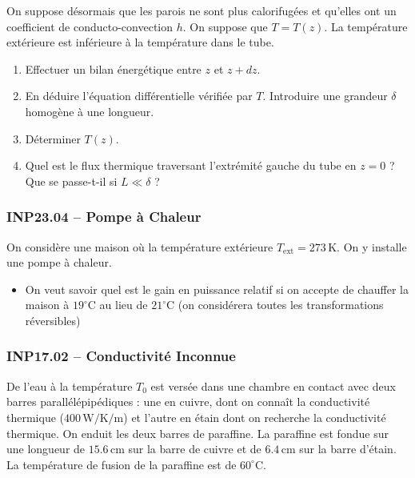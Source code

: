 On suppose désormais que les parois ne sont plus calorifugées et qu'elles ont un coefficient de conducto-convection $h$. On suppose que $T = T(z)$. La température extérieure est inférieure à la température dans le tube.

\begin{enumerate}[resume]
\item Effectuer un bilan énergétique entre $z$ et $z + dz$.
\item En déduire l'équation différentielle vérifiée par $T$. Introduire une grandeur $\delta$ homogène à une longueur.
\item Déterminer $T(z)$.
\item Quel est le flux thermique traversant l'extrémité gauche du tube en $z = 0$ ? Que se passe-t-il si $L \ll \delta$ ?
\end{enumerate}

\newpage
\subsubsection*{INP23.04 -- Pompe à Chaleur }

On considère une maison où la température extérieure $T_{\text{ext}} = 273\,\text{K}$. On y installe une pompe à chaleur.

\begin{itemize}[label=\textbullet]
\item On veut savoir quel est le gain en puissance relatif si on accepte de chauffer la maison à $19^\circ\text{C}$ au lieu de $21^\circ\text{C}$ (on considérera toutes les transformations réversibles)
\end{itemize}


\subsubsection*{INP17.02 -- Conductivité Inconnue  \corrige}

\begin{center}
\end{center}

De l'eau à la température $T_{0}$ est versée dans une chambre en contact avec deux barres parallélépipédiques : une en cuivre, dont on connaît la conductivité thermique ($400\,\text{W/K/m}$) et l'autre en étain dont on recherche la conductivité thermique. On enduit les deux barres de paraffine. La paraffine est fondue sur une longueur de $15.6\,\text{cm}$ sur la barre de cuivre et de $6.4\,\text{cm}$ sur la barre d'étain. La température de fusion de la paraffine est de $60^\circ\text{C}$.

